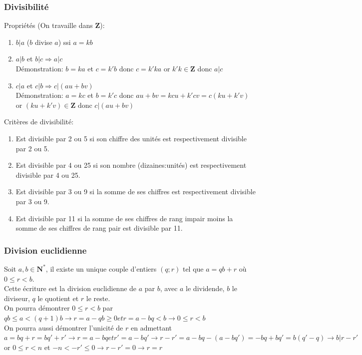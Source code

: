 \documentclass{article}
\begin{document}
\subsubsection{Divisibilité}
    Propriétés (On travaille dans $\mathbf{Z}$):
    \begin{enumerate}
        \item $b|a$ ($b$ divise $a$) ssi $a=kb$
        \item $a|b$ et $b|c \Rightarrow a|c$\\
        Démonstration: $b=ka$ et $c=k'b$ donc $c=k'ka$ or $k'k\in\mathbf{Z}$ donc $a|c$
        \item $c|a$ et $c|b \Rightarrow c|(au+bv)$\\
        Démonstration: $a=kc$ et $b=k'c$ donc $au+bv=kcu+k'cv=c(ku+k'v)$ or $(ku+k'v)\in\mathbf{Z}$ donc $c|(au+bv)$
    \end{enumerate}
    Critères de divisibilité:
    \begin{enumerate}
        \item Est divisible par 2 ou 5 si son chiffre des unités est respectivement divisible par 2 ou 5.
        \item Est divisible par 4 ou 25 si son nombre (dizaines:unités) est respectivement divisible par 4 ou 25.
        \item Est divisible par 3 ou 9 si la somme de ses chiffres est respectivement divisible par 3 ou 9.
        \item Est divisible par 11 si la somme de ses chiffres de rang impair moins la somme de ses chiffres de rang pair est divisible par 11.
    \end{enumerate}

\subsubsection{Division euclidienne}
    Soit $a,b\in\mathbf{N^*}$, il existe un unique couple d'entiers $(q;r)$ tel que $a=qb+r$ où $0\le r < b$. \\Cette écriture est la division euclidienne de $a$ par $b$, avec $a$ le dividende, $b$ le diviseur, $q$ le quotient et $r$ le reste.
    \\ On pourra démontrer $0\le r < b$ par $qb\le a<(q+1)b \rightarrow r=a-qb \ge 0 et r=a-bq<b \rightarrow 0\le r < b$
    \\ On pourra aussi démontrer l'unicité de $r$ en admettant $a=bq+r=bq'+r' \rightarrow r=a-bq et r'=a-bq' \rightarrow r-r' = a-bq - (a-bq') = -bq+bq' = b(q'-q) \rightarrow b|r-r' $ or $ 0 \le r < n $ et $ -n<-r'\le 0\rightarrow r-r'=0 \rightarrow r=r$
\end{document}
